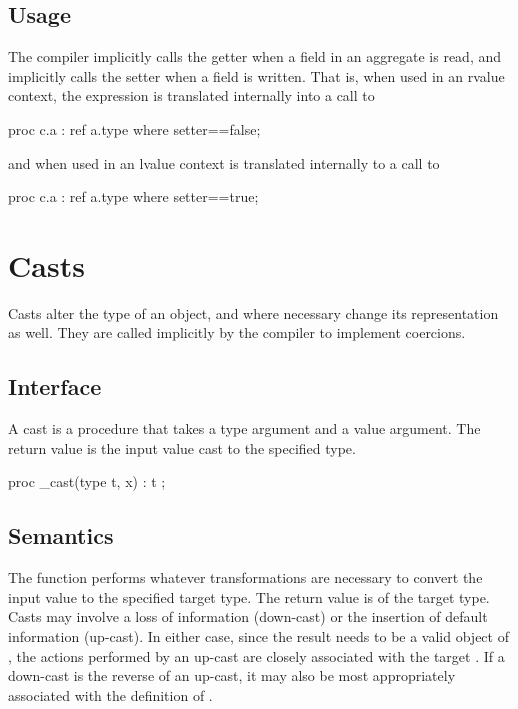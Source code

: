 \subsection{Usage}

The compiler implicitly calls the getter when a field in an aggregate is read,
and implicitly calls the setter when a field is written.  That is, when used in
an rvalue context, the expression  is translated internally into
a call to
\begin{chapel}
proc c.a : ref a.type where setter==false;
\end{chapel}
and when used in an lvalue context is translated internally to a call to
\begin{chapel}
proc c.a : ref a.type where setter==true;
\end{chapel}



\section{Casts}

Casts alter the type of an object, and where necessary change its representation as well.
They are called implicitly by the compiler to implement coercions.

\subsection{Interface}

A cast is a procedure that takes a type argument and a value argument.  The return value
is the input value cast to the specified type.
\begin{chapel}
proc _cast(type t, x) : t ;
\end{chapel}

\subsection{Semantics}

The  function performs whatever transformations are necessary to convert the
input value  to the specified target type.  The return value is of the target
type.  Casts may involve a loss of information (down-cast) or the insertion of default
information (up-cast).  In either case, since the result needs to be a valid object of
, the actions performed by an up-cast are closely associated with the target
.  If a down-cast is the reverse of an up-cast, it may also be most
appropriately associated with the definition of .


